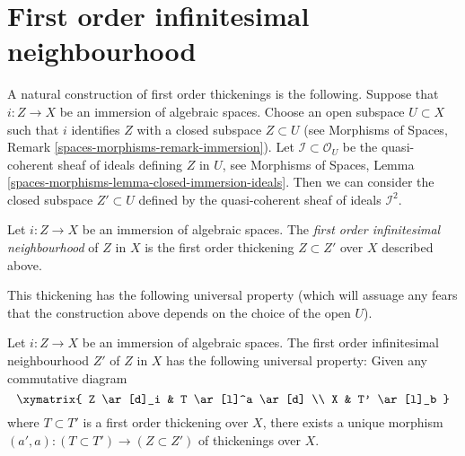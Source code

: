 \section{First order infinitesimal neighbourhood}
\label{section-first-order-infinitesimal-neighbourhood}

\noindent
A natural construction of first order thickenings is the following.
Suppose that $i : Z \to X$ be an immersion of algebraic spaces. Choose an
open subspace $U \subset X$ such that $i$ identifies $Z$ with a closed
subspace $Z \subset U$ (see
Morphisms of Spaces, Remark \ref{spaces-morphisms-remark-immersion}).
Let $\mathcal{I} \subset \mathcal{O}_U$ be the
quasi-coherent sheaf of ideals defining $Z$ in $U$, see
Morphisms of Spaces,
Lemma \ref{spaces-morphisms-lemma-closed-immersion-ideals}.
Then we can consider
the closed subspace $Z' \subset U$ defined by the quasi-coherent sheaf
of ideals $\mathcal{I}^2$.

\begin{definition}
\label{definition-first-order-infinitesimal-neighbourhood}
Let $i : Z \to X$ be an immersion of algebraic spaces. The
{\it first order infinitesimal neighbourhood} of $Z$ in $X$ is
the first order thickening $Z \subset Z'$ over $X$ described above.
\end{definition}

\noindent
This thickening has the following universal property (which will assuage
any fears that the construction above depends on the choice of the open
$U$).

\begin{lemma}
\label{lemma-first-order-infinitesimal-neighbourhood}
Let $i : Z \to X$ be an immersion of algebraic spaces.
The first order infinitesimal neighbourhood $Z'$ of $Z$ in $X$
has the following universal property:
Given any commutative diagram
$$
\xymatrix{
Z \ar[d]_i & T \ar[l]^a \ar[d] \\
X & T' \ar[l]_b
}
$$
where $T \subset T'$ is a first order thickening over $X$, there exists
a unique morphism $(a', a) : (T \subset T') \to (Z \subset Z')$ of
thickenings over $X$.
\end{lemma}


